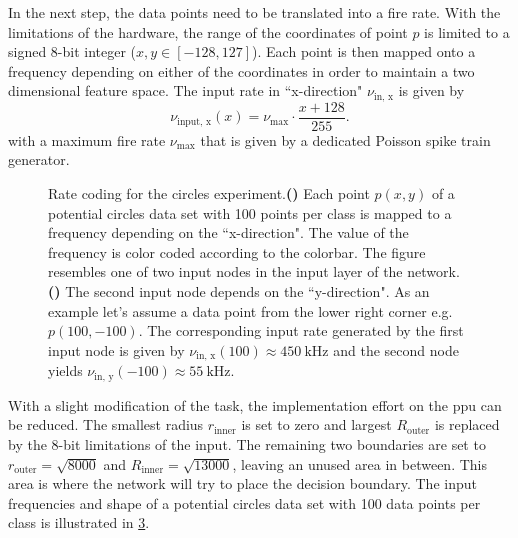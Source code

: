 In the next step, the data points need to be translated into a fire rate. With the limitations of the hardware, the range of the coordinates of point $p$ is limited to a signed 8-bit integer ($x, y \in [-128,127]$). Each point is then mapped onto a frequency depending on either of the coordinates in order to maintain a two dimensional feature space. The input rate in ``x-direction" $\nu_{\text{in, x}}$ is given by
\begin{equation}\label{inputfrequency}
\nu_{\text{input, x}}(x) = \nu_\text{max} \cdot \frac{x + 128}{255}.
\end{equation}
with a maximum fire rate $\nu_\text{max}$ that is given by a dedicated Poisson spike train generator.

\begin{figure}
	\begin{subfigure}[c]{0.5\textwidth}
		\centering
		\caption{}
		\label{nuxinput}
	\end{subfigure}
	\begin{subfigure}[c]{0.5\textwidth}
		\centering
		\caption{}
		\label{nuyinput}
	\end{subfigure}
	\caption[Rate coding for the circles experiment.]{Rate coding for the circles experiment.\textbf{()} Each point $p(x,y)$ of a potential circles data set with 100 points per class is mapped to a frequency depending on the ``x-direction". The value of the frequency is color coded according to the colorbar. The figure resembles one of two input nodes in the input layer of the network. \textbf{()} The second input node depends on the ``y-direction".  As an example let's assume a data point from the lower right corner e.g. $p(100,-100)$. The corresponding input rate generated by the first input node is given by $\nu_{\text{in, x}}(100) \approx \SI{450}{\kilo \Hz}$ and the second node yields $\nu_{\text{in, y}}(-100) \approx \SI{55}{\kilo \Hz}$.}
	\label{circlesinputs}
	
\end{figure}

With a slight modification of the task, the implementation effort on the \gls{ppu} can be reduced. The smallest radius $r_{\text{inner}}$ is set to zero and largest $R_{\text{outer}}$ is replaced by the 8-bit limitations of the input. The remaining two boundaries are set to $r_{\text{outer}} = \sqrt{8000}$ and $R_{\text{inner}} = \sqrt{13000}$, leaving an unused area in between. This area is where the network will try to place the decision boundary. The input frequencies and shape of a potential circles data set with 100 data points per class is illustrated in \cref{circlesinputs}. 

